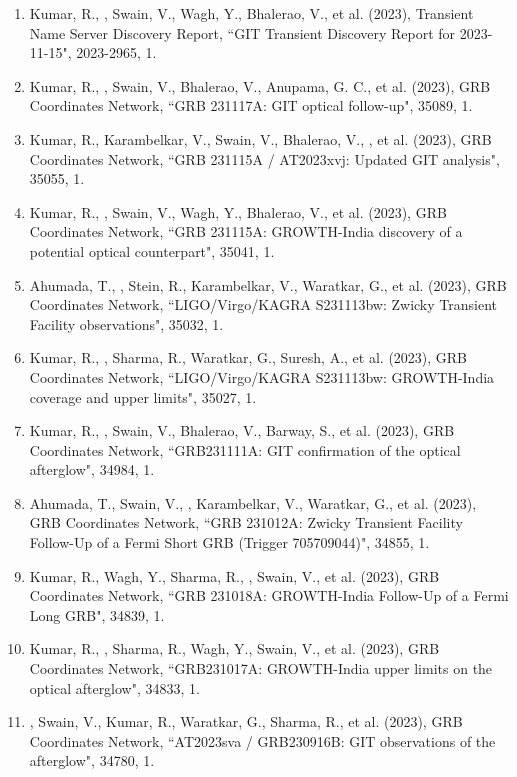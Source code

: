 \begin{enumerate}
\item Kumar, R., \me, Swain, V., Wagh, Y., Bhalerao, V., et al. (2023), Transient Name Server Discovery Report, {``GIT Transient Discovery Report for 2023-11-15"}, 2023-2965, 1.

\item Kumar, R., \me, Swain, V., Bhalerao, V., Anupama, G. C., et al. (2023), GRB Coordinates Network, {``GRB 231117A: GIT optical follow-up"}, 35089, 1.

\item Kumar, R., Karambelkar, V., Swain, V., Bhalerao, V., \me, et al. (2023), GRB Coordinates Network, {``GRB 231115A / AT2023xvj: Updated GIT analysis"}, 35055, 1.

\item Kumar, R., \me, Swain, V., Wagh, Y., Bhalerao, V., et al. (2023), GRB Coordinates Network, {``GRB 231115A: GROWTH-India discovery of a potential optical counterpart"}, 35041, 1.

\item Ahumada, T., \me, Stein, R., Karambelkar, V., Waratkar, G., et al. (2023), GRB Coordinates Network, {``LIGO/Virgo/KAGRA S231113bw: Zwicky Transient Facility observations"}, 35032, 1.

\item Kumar, R., \me, Sharma, R., Waratkar, G., Suresh, A., et al. (2023), GRB Coordinates Network, {``LIGO/Virgo/KAGRA S231113bw: GROWTH-India coverage and upper limits"}, 35027, 1.

\item Kumar, R., \me, Swain, V., Bhalerao, V., Barway, S., et al. (2023), GRB Coordinates Network, {``GRB231111A: GIT confirmation of the optical afterglow"}, 34984, 1.

\item Ahumada, T., Swain, V., \me, Karambelkar, V., Waratkar, G., et al. (2023), GRB Coordinates Network, {``GRB 231012A: Zwicky Transient Facility Follow-Up of a Fermi Short GRB (Trigger 705709044)"}, 34855, 1.

\item Kumar, R., Wagh, Y., Sharma, R., \me, Swain, V., et al. (2023), GRB Coordinates Network, {``GRB 231018A: GROWTH-India Follow-Up of a Fermi Long GRB"}, 34839, 1.

\item Kumar, R., \me, Sharma, R., Wagh, Y., Swain, V., et al. (2023), GRB Coordinates Network, {``GRB231017A: GROWTH-India upper limits on the optical afterglow"}, 34833, 1.

\item \me, Swain, V., Kumar, R., Waratkar, G., Sharma, R., et al. (2023), GRB Coordinates Network, {``AT2023sva / GRB230916B: GIT observations of the afterglow"}, 34780, 1.


\end{enumerate}
